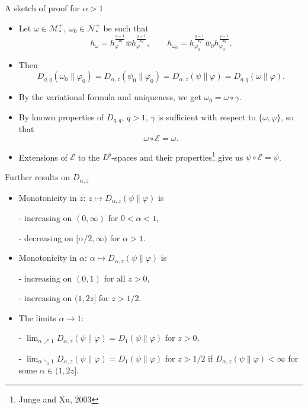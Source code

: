 \documentclass[mathserif]{beamer}
\newcommand{\<}{\langle}
\renewcommand{\>}{\rangle}
\newcommand{\Ee}{\mathcal E}
\newcommand{\Me}{\mathcal M}
\newcommand{\Ne}{\mathcal N}
\begin{document}
\begin{frame}{A sketch of proof for $\alpha>1$}


\begin{itemize}
\item Let $\omega\in \Me_*^+$, $\omega_0\in \Ne_*^+$ be such that
\[
h_\omega=h_\varphi^{\frac{q-1}{2q}}\bar wh_\varphi^{\frac{q-1}{2q}},\qquad
h_{\omega_0}=h_{\varphi_0}^{\frac{q-1}{2q}}\bar w_0h_{\varphi_0}^{\frac{q-1}{2q}}.
\]

\item Then
\[
D_{q,q}(\omega_0\|\varphi_0)=D_{\alpha,z}(\psi_0\|\varphi_0)=D_{\alpha,z}(\psi\|\varphi)=D_{q,q}(\omega\|\varphi).
\]
\item By the variational formula and uniqueness, we get $\omega_0=\omega\circ\gamma$.
\item By known properties of $D_{q,q}$, $q>1$, $\gamma$ is sufficient with respect to
$\{\omega,\varphi\}$, so that 
\[
\omega\circ\Ee=\omega.
\]

\item Extensions of $\Ee$ to the $L^p$-spaces and their properties\footnote{Junge and Xu,
2003} give us $\psi\circ\Ee=\psi$.

\end{itemize}


\end{frame}


\begin{frame}{Further results on $D_{\alpha,z}$}

\begin{itemize}
\item Monotonicity in $z$: $z\mapsto D_{\alpha,z}(\psi\|\varphi)$ is
\medskip

- increasing on $(0,\infty)$ for $0<\alpha<1$,

- decreasing on $[\alpha/2,\infty)$ for $\alpha>1$.
\medskip

\item Monotonicity in $\alpha$: $\alpha\mapsto D_{\alpha,z}(\psi\|\varphi)$ is
\medskip

- increasing on $(0,1)$ for all $z>0$,

- increasing on $(1,2z]$ for $z>1/2$.

\medskip
\item The limits $\alpha\to1$: 
\medskip

- $\lim_{\alpha\nearrow 1} D_{\alpha,z}(\psi\|\varphi)= D_1(\psi\|\varphi)$ for $z>0$,

\medskip
- $\lim_{\alpha\searrow 1} D_{\alpha,z}(\psi\|\varphi)= D_1(\psi\|\varphi)$ for $z>1/2$ if
\vskip 2mm
$D_{\alpha,z}(\psi\|\varphi)<\infty$ for some $\alpha\in (1,2z]$.




\end{itemize}


\end{frame}


\begin{frame}{}









\end{frame}
\end{document}
